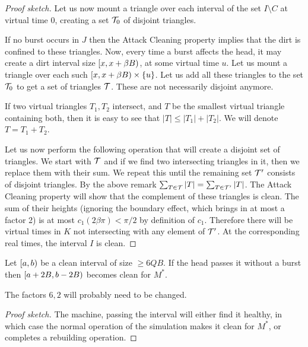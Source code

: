 \documentclass[12pt]{memoir}
\renewcommand{\le}{\leq}
\renewcommand{\ge}{\geq}
\def\B{B}
\newcommand{\Q}{Q}
\begin{document}
\begin{proof}[Proof sketch]
Let us now mount a triangle over each interval of the set \( I\setminus C \)
at virtual time 0, creating a set \( \mathcal{T}_{0} \) of disjoint triangles.

If no burst occurs in \( J \) 
then the Attack Cleaning property implies that the dirt is confined to these triangles.
Now, every time a burst affects the head, it may create a dirt interval 
size \( \lint{x}{x+\beta\B} \), at some virtual time \( u \).
Let us mount a triangle over each such \( \lint{x}{x+\beta\B}\times\{u\} \).
Let us add all these triangles to the set \( \mathcal{T}_{0} \) to get a set of
triangles \( \mathcal{T} \).
These are not necessarily disjoint anymore.

If two virtual triangles \( T_{1},T_{2} \) intersect,
and \( T \) be the smallest virtual triangle containing both,
then it is easy to see that \( |T|\le|T_{1}|+|T_{2}| \).
We will denote \( T=T_{1}+T_{2} \).

Let us now perform the following operation that will create a disjoint set
of triangles.
We start with \( \mathcal{T} \) and if we find two intersecting triangles 
in it, then we replace them with their sum.
We repeat this until the remaining set \( \mathcal{T}' \) consists of disjoint triangles.
By the above remark \( \sum_{T\in \mathcal{T}}|T| = \sum_{T\in \mathcal{T}'}|T| \).
The Attack Cleaning property will show that the complement of these triangles
is clean.
The sum of their heights (ignoring the boundary effect, which brings in at most a factor 2) is
at most \( c_{1}(2\beta\pi)< \pi/2 \) by definition of \( c_{1} \).
Therefore there will be virtual
times in \( K \) not intersecting with any element of \( \mathcal{T}' \).
At the corresponding real times, the interval \( I \) is clean.
\end{proof}

\begin{lemma}\label{lem:rebuild-pass}
  Let \( \left[a,b\right) \) be a clean interval of size \( \ge 6 \Q\B \).
If the head passes it without a burst then \( \lint{a+2\B}{b-2\B} \)
becomes clean for \( M^{*} \).
\end{lemma}
The factors \( 6,2 \) will probably need to be changed.
\begin{proof}[Proof sketch]
  The machine, passing the interval will either find it healthy, in which case
the normal operation of the simulation makes it clean for \( M^{*} \),
or completes a rebuilding operation.
\end{proof}
\end{document}
